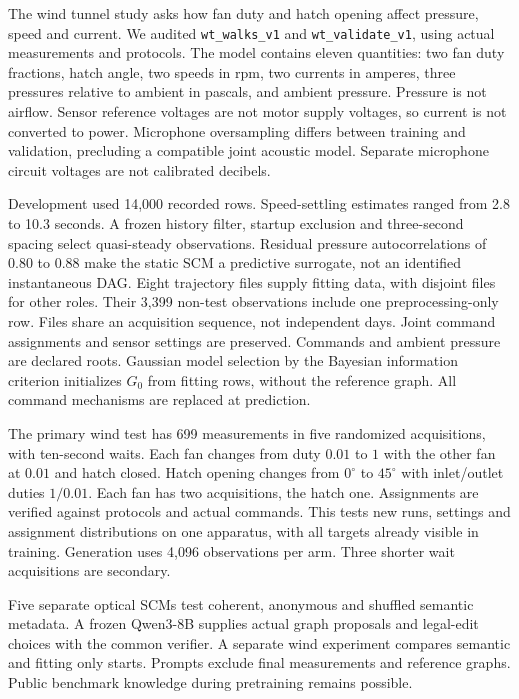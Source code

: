 \documentclass{svproc}
\begin{document}
The wind tunnel study asks how fan duty and hatch opening affect pressure,
speed and current. We audited \nolinkurl{wt_walks_v1} and
\nolinkurl{wt_validate_v1}, using actual measurements and protocols. The model
contains eleven quantities: two fan duty fractions, hatch angle, two speeds in
rpm, two currents in amperes, three pressures relative to ambient in pascals,
and ambient pressure. Pressure is not airflow. Sensor reference voltages are not
motor supply voltages, so current is not converted to power. Microphone
oversampling differs between training and validation, precluding a compatible
joint acoustic model. Separate microphone circuit voltages are not calibrated
decibels.

Development used 14,000 recorded rows. Speed-settling estimates ranged from
2.8 to 10.3 seconds. A frozen history filter, startup exclusion and three-second
spacing select quasi-steady observations. Residual pressure autocorrelations of
0.80 to 0.88 make the static SCM a predictive surrogate, not an identified
instantaneous DAG. Eight trajectory files supply fitting data, with disjoint
files for other roles. Their 3,399 non-test observations include one
preprocessing-only row. Files share an acquisition sequence, not independent
days. Joint command assignments and sensor settings are preserved. Commands and
ambient pressure are declared roots. Gaussian model selection by the Bayesian information criterion initializes
$G_0$ from fitting rows, without the reference graph. All command mechanisms are replaced at prediction.

The primary wind test has 699 measurements in five randomized acquisitions,
with ten-second waits. Each fan changes from duty $0.01$ to $1$ with the other
fan at $0.01$ and hatch closed. Hatch opening changes from $0^\circ$ to $45^\circ$
with inlet/outlet duties $1/0.01$. Each fan has two acquisitions, the hatch one.
Assignments are verified against protocols and actual commands. This tests new
runs, settings and assignment distributions on one apparatus, with all targets
already visible in training. Generation uses 4,096 observations per arm. Three
shorter wait acquisitions are secondary.

Five separate optical SCMs test coherent, anonymous and shuffled semantic
metadata. A frozen Qwen3-8B \cite{yang2025} supplies actual graph proposals and
legal-edit choices with the common verifier. A separate wind experiment compares
semantic and fitting  only starts. Prompts exclude final measurements and reference
graphs. Public benchmark knowledge during pretraining remains possible.
\end{document}
